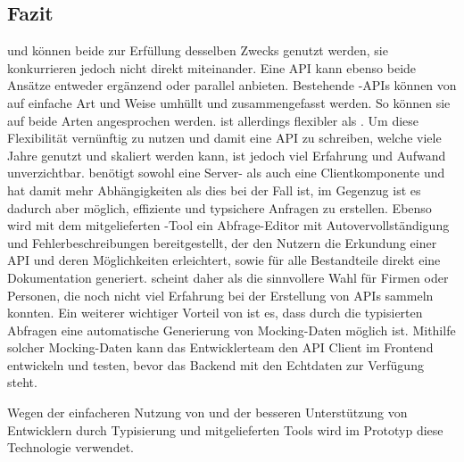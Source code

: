 \subsection{Fazit}
 und  können beide zur Erfüllung desselben Zwecks genutzt werden, sie konkurrieren jedoch nicht direkt miteinander. Eine API kann ebenso beide Ansätze entweder ergänzend oder parallel anbieten. Bestehende -APIs können von  auf einfache Art und Weise umhüllt und zusammengefasst werden. So können sie auf beide Arten angesprochen werden.  ist allerdings flexibler als \@. Um diese Flexibilität vernünftig zu nutzen und damit eine API zu schreiben, welche viele Jahre genutzt und skaliert werden kann, ist jedoch viel Erfahrung und Aufwand unverzichtbar.  benötigt sowohl eine Server- als auch eine Clientkomponente und hat damit mehr Abhängigkeiten als dies bei  der Fall ist, im Gegenzug ist es dadurch aber möglich, effiziente und typsichere Anfragen zu erstellen. Ebenso wird mit dem mitgelieferten -Tool ein Abfrage-Editor mit Autovervollständigung und Fehlerbeschreibungen bereitgestellt, der den Nutzern die Erkundung einer API und deren Möglichkeiten erleichtert, sowie für alle Bestandteile direkt eine Dokumentation generiert.  scheint daher als die sinnvollere Wahl für Firmen oder Personen, die noch nicht viel Erfahrung bei der Erstellung von APIs sammeln konnten. Ein weiterer wichtiger Vorteil von  ist es, dass durch die typisierten Abfragen eine automatische Generierung von Mocking-Daten möglich ist. Mithilfe solcher Mocking-Daten kann das Entwicklerteam den API Client im Frontend entwickeln und testen, bevor das Backend mit den Echtdaten zur Verfügung steht.

Wegen der einfacheren Nutzung von  und der besseren Unterstützung von Entwicklern durch Typisierung und mitgelieferten Tools wird im Prototyp diese Technologie verwendet.
